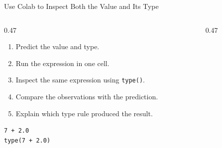 \documentclass[aspectratio=169,10pt]{beamer}
\begin{document}
\begin{frame}{Use Colab to Inspect Both the Value and Its Type}

  \begin{columns}[T,onlytextwidth]

    \begin{column}{0.47\textwidth}

      \begin{enumerate}

        \item Predict the value and type.

        \item Run the expression in one cell.

        \item Inspect the same expression using \texttt{type()}.

        \item Compare the observations with the prediction.

        \item Explain which type rule produced the result.

      \end{enumerate}

      \begin{exampleblockcp}

        \texttt{7 + 2.0}\\
        \texttt{type(7 + 2.0)}

      \end{exampleblockcp}

    \end{column}

    \begin{column}{0.47\textwidth}

    \end{column}

  \end{columns}

\end{frame}
\end{document}
